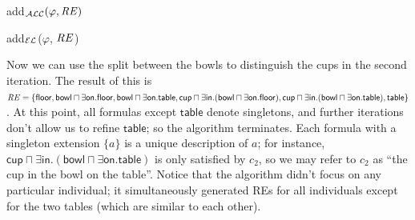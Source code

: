 \begin{algorithm}[t]
\caption{add$_\mathcal{ALC}(\varphi,\mathit{RE})$}
\label{algo:bisim-add-alc}
\end{algorithm}
%
\begin{algorithm}[t]
\dontprintsemicolon
\caption{add$_\mathcal{EL}$($\varphi$, $\mathit{RE}$)}
\label{algo:bisim-add-el}
\end{algorithm}

Now we can use the split between the bowls to distinguish the cups in
the second iteration.  The result of this is $\mathit{RE} = \{ \mathsf{floor},
\mathsf{bowl} \sqcap \exists \mathsf{on}.\mathsf{floor}, \mathsf{bowl}
\sqcap \exists \mathsf{on}.\mathsf{table}, \mathsf{cup} \sqcap \exists
\mathsf{in}. (\mathsf{bowl} \sqcap \exists
\mathsf{on}.\mathsf{floor}), \mathsf{cup} \sqcap \exists
\mathsf{in}. (\mathsf{bowl} \sqcap \exists
\mathsf{on}.\mathsf{table}), \mathsf{table} \}$.  At this point, all
formulas except $\mathsf{table}$ denote singletons, and further
iterations don't allow us to refine $\mathsf{table}$; so the algorithm
terminates.  Each formula with a singleton extension $\{a\}$ is a
unique description of $a$; for instance, $\mathsf{cup} \sqcap \exists
\mathsf{in}. (\mathsf{bowl} \sqcap \exists
\mathsf{on}.\mathsf{table})$ is only satisfied by $c_2$, so we may
refer to $c_2$ as ``the cup in the bowl on the table''.  Notice that
the algorithm didn't focus on any particular individual; it
simultaneously generated REs for all individuals except for the two
tables (which are similar to each other).



